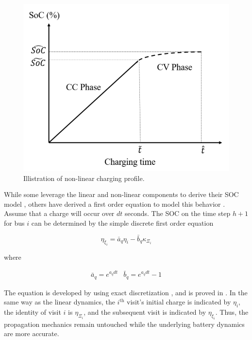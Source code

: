 \documentclass[ee,msthesis]{usuthesis}
\begin{document}
\begin{figure}[htbp]
\centering
\includegraphics[width=.9\linewidth]{img/soc-plot.png}
\caption{\label{fig:soc-plot}Illistration of non-linear charging profile.}
\end{figure}

While some leverage the linear and non-linear components to derive their SOC model \cite{abdollahi-2016-optim-batter},
others have derived a first order equation to model this behavior \cite{whitaker-2022-a-network}. Assume that a charge
will occur over \(dt\) seconds. The SOC on the time step \(h+1\) for bus \(i\) can be determined by the simple discrete first
order equation

\begin{equation}
  \eta_{\xi_i} = \bar{a}_q \eta_i - \bar{b}_q \kappa_{\Xi_i}
\end{equation}

where

\begin{equation}
\begin{array}{cc}
  \bar{a}_q = e^{a_q dt} & \bar{b}_q = e^{a_q dt} - 1
\end{array}
\end{equation}

The equation is developed by using exact discretization \cite{hespanha-2018-linear}, and is proved in
\cite{whitaker-2022-a-network}. In the same way as the linear dynamics, the \(i^{\text{th}}\) visit's initial charge is
indicated by \(\eta_i\), the identity of visit \(i\) is \(\eta_{\Xi_i}\), and the subsequent visit is indicated by \(\eta_{\xi_i}\). Thus,
the propagation mechanics remain untouched while the underlying battery dynamics are more accurate.
\end{document}
